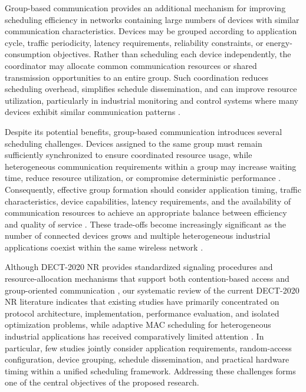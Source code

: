 \documentclass[12pt,a4paper]{article}
\begin{document}
Group-based communication provides an additional mechanism for improving scheduling efficiency in networks containing large numbers of devices with similar communication characteristics. Devices may be grouped according to application cycle, traffic periodicity, latency requirements, reliability constraints, or energy-consumption objectives. Rather than scheduling each device independently, the coordinator may allocate common communication resources or shared transmission opportunities to an entire group. Such coordination reduces scheduling overhead, simplifies schedule dissemination, and can improve resource utilization, particularly in industrial monitoring and control systems where many devices exhibit similar communication patterns \cite{etsi_ts103636_4}.

Despite its potential benefits, group-based communication introduces several scheduling challenges. Devices assigned to the same group must remain sufficiently synchronized to ensure coordinated resource usage, while heterogeneous communication requirements within a group may increase waiting time, reduce resource utilization, or compromise deterministic performance \cite{willigWirelessTechnologyIndustrial2005,vitturiIndustrialWirelessNetworks2013}. Consequently, effective group formation should consider application timing, traffic characteristics, device capabilities, latency requirements, and the availability of communication resources to achieve an appropriate balance between efficiency and quality of service \cite{andrewsProvidingQualityService2001,fattahOverviewSchedulingAlgorithms2002a}. These trade-offs become increasingly significant as the number of connected devices grows and multiple heterogeneous industrial applications coexist within the same wireless network \cite{wollschlaegerFutureIndustrialCommunication2017a}.

Although DECT-2020 NR provides standardized signaling procedures and resource-allocation mechanisms that support both contention-based access and group-oriented communication \cite{etsi_ts103636_4}, our systematic review of the current DECT-2020 NR literature indicates that existing studies have primarily concentrated on protocol architecture, implementation, performance evaluation, and isolated optimization problems, while adaptive MAC scheduling for heterogeneous industrial applications has received comparatively limited attention \cite{gaidamakaOptimizingDelaysRandom2025,kovalchukovDECT2020NewRadio2022}. In particular, few studies jointly consider application requirements, random-access configuration, device grouping, schedule dissemination, and practical hardware timing within a unified scheduling framework. Addressing these challenges forms one of the central objectives of the proposed research.
\end{document}
